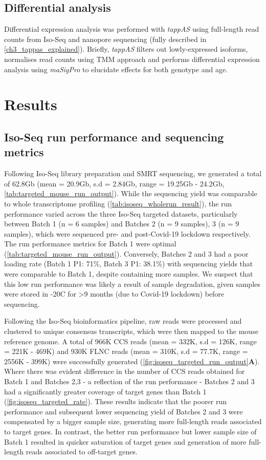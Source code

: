 \subsection{Differential analysis}
Differential expression analysis was performed with \textit{tappAS} using full-length read counts from Iso-Seq and nanopore sequencing (fully described in \cref{ch3_tappas_explained}). Briefly, \textit{tappAS} filters out lowly-expressed isoforms, normalises read counts using TMM approach and performs differential expression analysis using \textit{maSigPro}\cite{Conesa2006,Nueda2014,Conesa2017} to elucidate effects for both genotype and age. 

\newpage
\section{Results}
\subsection{Iso-Seq run performance and sequencing metrics}
Following Iso-Seq library preparation and SMRT sequencing, we generated a total of 62.8Gb (mean = 20.9Gb, s.d = 2.84Gb, range = 19.25Gb - 24.2Gb, \cref{tab:targeted_mouse_run_output}). While the sequencing yield was comparable to whole transcriptome profiling (\cref{tab:isoseq_wholerun_result}), the run performance varied across the three Iso-Seq targeted datasets, particularly between Batch 1 (n = 6 samples) and Batches 2 (n = 9 samples), 3 (n = 9 samples), which were sequenced pre- and post-Covid-19 lockdown respectively. The run performance metrics for Batch 1 were optimal (\cref{tab:targeted_mouse_run_output}). Conversely, Batches 2 and 3 had a poor loading rate (Batch 1 P1:  71\%, Batch 3 P1: 38.1\%) with sequencing yields that were comparable to Batch 1, despite containing more samples. We suspect that this low run performance was likely a result of sample degradation, given samples were stored in -20\textdegree C for >9 months (due to Covid-19 lockdown) before sequencing. 

Following the Iso-Seq bioinformatics pipeline, raw reads were processed and clustered to unique consensus transcripts, which were then mapped to the mouse reference genome. A total of 966K CCS reads (mean = 332K, s.d = 126K, range =  221K - 469K) and 930K FLNC reads (mean = 310K, s.d = 77.7K, range = 2556K - 399K) were successfully generated (\cref{fig:isoseq_targeted_run_output}\textbf{A}). Where there was evident difference in the number of CCS reads obtained for Batch 1 and Batches 2,3 - a reflection of the run performance - Batches 2 and 3 had a significantly greater coverage of target genes than Batch 1 (\cref{fig:isoseq_targeted_rate}). These results indicate that the poorer run performance and subsequent lower sequencing yield of Batches 2 and 3 were compensated by a bigger sample size, generating more full-length reads associated to target genes. In contrast, the better run performance but lower sample size of Batch 1 resulted in quicker saturation of target genes and generation of more full-length reads associated to off-target genes. 

